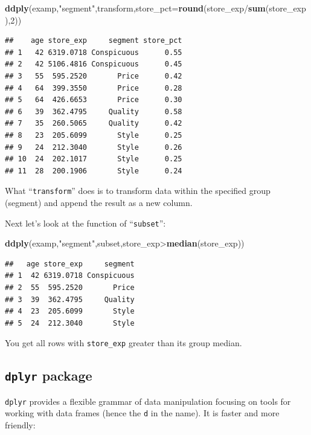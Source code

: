 \documentclass[]{book}
\newenvironment{Shaded}{\begin{snugshade}}{\end{snugshade}}
\newcommand{\KeywordTok}[1]{\textcolor[rgb]{0.13,0.29,0.53}{\textbf{{#1}}}}
\newcommand{\DataTypeTok}[1]{\textcolor[rgb]{0.13,0.29,0.53}{{#1}}}
\newcommand{\DecValTok}[1]{\textcolor[rgb]{0.00,0.00,0.81}{{#1}}}
\newcommand{\StringTok}[1]{\textcolor[rgb]{0.31,0.60,0.02}{{#1}}}
\newcommand{\NormalTok}[1]{{#1}}
\theoremstyle{definition}
\theoremstyle{definition}
\theoremstyle{remark}
\begin{document}
\begin{Shaded}
\begin{Highlighting}[]
\KeywordTok{ddply}\NormalTok{(examp,}\StringTok{"segment"}\NormalTok{,transform,}\DataTypeTok{store_pct=}\KeywordTok{round}\NormalTok{(store_exp/}\KeywordTok{sum}\NormalTok{(store_exp),}\DecValTok{2}\NormalTok{))}
\end{Highlighting}
\end{Shaded}

\begin{verbatim}
##    age store_exp     segment store_pct
## 1   42 6319.0718 Conspicuous      0.55
## 2   42 5106.4816 Conspicuous      0.45
## 3   55  595.2520       Price      0.42
## 4   64  399.3550       Price      0.28
## 5   64  426.6653       Price      0.30
## 6   39  362.4795     Quality      0.58
## 7   35  260.5065     Quality      0.42
## 8   23  205.6099       Style      0.25
## 9   24  212.3040       Style      0.26
## 10  24  202.1017       Style      0.25
## 11  28  200.1906       Style      0.24
\end{verbatim}

What ``\texttt{transform}'' does is to transform data within the
specified group (segment) and append the result as a new column.

Next let's look at the function of ``\texttt{subset}'':

\begin{Shaded}
\begin{Highlighting}[]
\KeywordTok{ddply}\NormalTok{(examp,}\StringTok{"segment"}\NormalTok{,subset,store_exp>}\KeywordTok{median}\NormalTok{(store_exp))}
\end{Highlighting}
\end{Shaded}

\begin{verbatim}
##   age store_exp     segment
## 1  42 6319.0718 Conspicuous
## 2  55  595.2520       Price
## 3  39  362.4795     Quality
## 4  23  205.6099       Style
## 5  24  212.3040       Style
\end{verbatim}

You get all rows with \texttt{store\_exp} greater than its group median.

\subsection{\texorpdfstring{\texttt{dplyr}
package}{dplyr package}}\label{dplyr-package}

\texttt{dplyr} provides a flexible grammar of data manipulation focusing
on tools for working with data frames (hence the \texttt{d} in the
name). It is faster and more friendly:
\end{document}

